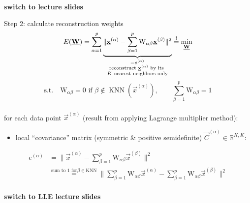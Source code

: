 \begin{frame}
\textbf{switch to lecture slides}

\end{frame}

\begin{frame}{Step 2: calculate reconstruction weights}
\begin{equation}
E(\underline{\mathbf{W}}) = \sum_{\alpha=1}^{p} \underbrace{\lVert\underline{\mathbf{x}}^{(\alpha)} - \sum_{\beta=1}^{p} \mathrm{W}_{\alpha \beta} \underline{\mathbf{x}}^{(\beta)}\rVert^2}_{
\substack{=e^{(\alpha)}\\\text{reconstruct } \underline{\mathbf{x}}^{(\alpha)} \text{ by its } \\ K \text{ nearest neighbors only}}
}
\stackrel{\mathrm{!}}{=} \min_{\underline{\mathbf{W}}}
\end{equation}
\begin{equation}
\text{s.t.} \quad \mathrm{W}_{\alpha \beta} = 0 \text{ if } \beta \notin \operatorname{KNN}(\vec{x}^{(\alpha)}), \qquad
\sum_{\beta=1}^{p} \mathrm{W}_{\alpha \beta} = 1
\end{equation}\\

for each data point $\vec{x}^{(\alpha)}$ (result from applying Lagrange multiplier method):
\begin{itemize}
	\item local ``covariance'' matrix (symmetric \& positive semidefinite) $\vec{C}^{(\alpha)} \in \mathbb{R}^{K,K}:$ 
\end{itemize}

\end{frame}

\begin{frame}


\begin{align}
e^{(\alpha)} &= \lVert\vec{x}^{(\alpha)} - \sum_{\beta=1}^{p} \mathrm{W}_{\alpha \beta} \vec{x}^{(\beta)}\rVert^2\\
&\stackrel{\text{sum to 1 for} \beta \in \text{KNN}}{=} \lVert \sum_{\beta=1}^{p} \mathrm{W}_{\alpha \beta} \vec{x}^{(\alpha)} - \sum_{\beta=1}^{p} \mathrm{W}_{\alpha \beta} \vec{x}^{(\beta)}\rVert^2\\
\end{align}

\textbf{switch to LLE lecture slides}

\end{frame}

